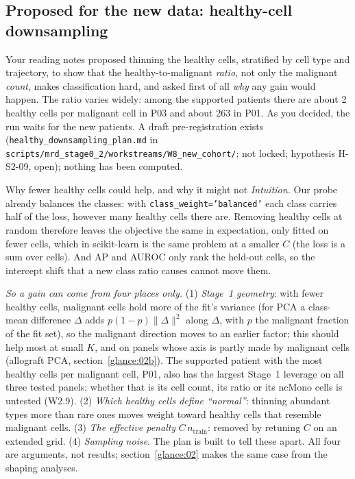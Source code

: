 \subsection{Proposed for the new data: healthy-cell downsampling}
\label{sec:09_downsampling}

Your reading notes proposed thinning the healthy cells, stratified by cell type and trajectory, to show that the healthy-to-malignant \emph{ratio}, not only the malignant \emph{count}, makes classification hard, and asked first of all \emph{why} any gain would happen. The ratio varies widely: among the supported patients there are about 2 healthy cells per malignant cell in P03 and about 263 in P01. As you decided, the run waits for the new patients. A draft pre-registration exists (\texttt{healthy\_downsampling\_plan.md} in \texttt{scripts/\allowbreak mrd\_stage0\_2/\allowbreak workstreams/\allowbreak W8\_new\_cohort/}; not locked; hypothesis H-S2-09, open); nothing has been computed.

\begin{explainbox}{Why fewer healthy cells could help, and why it might not}
\emph{Intuition.} Our probe already balances the classes: with \texttt{class\_weight='balanced'} each class carries half of the loss, however many healthy cells there are. Removing healthy cells at random therefore leaves the objective the same in expectation, only fitted on fewer cells, which in scikit-learn is the same problem at a smaller $C$ (the loss is a sum over cells). And AP and AUROC only rank the held-out cells, so the intercept shift that a new class ratio causes cannot move them.

\emph{So a gain can come from four places only.} (1) \emph{Stage~1 geometry}: with fewer healthy cells, malignant cells hold more of the fit's variance (for PCA a class-mean difference $\Delta$ adds $p(1-p)\lVert\Delta\rVert^2$ along $\Delta$, with $p$ the malignant fraction of the fit set), so the malignant direction moves to an earlier factor; this should help most at small $K$, and on panels whose axis is partly made by malignant cells (allograft PCA, section~\ref{glance:02b}). The supported patient with the most healthy cells per malignant cell, P01, also has the largest Stage~1 leverage on all three tested panels; whether that is its cell count, its ratio or its ncMono cells is untested (W2.9). (2) \emph{Which healthy cells define ``normal''}: thinning abundant types more than rare ones moves weight toward healthy cells that resemble malignant cells. (3) \emph{The effective penalty} $C\,n_{\text{train}}$: removed by retuning $C$ on an extended grid. (4) \emph{Sampling noise}. The plan is built to tell these apart. All four are arguments, not results; section~\ref{glance:02} makes the same case from the shaping analyses.
\end{explainbox}

